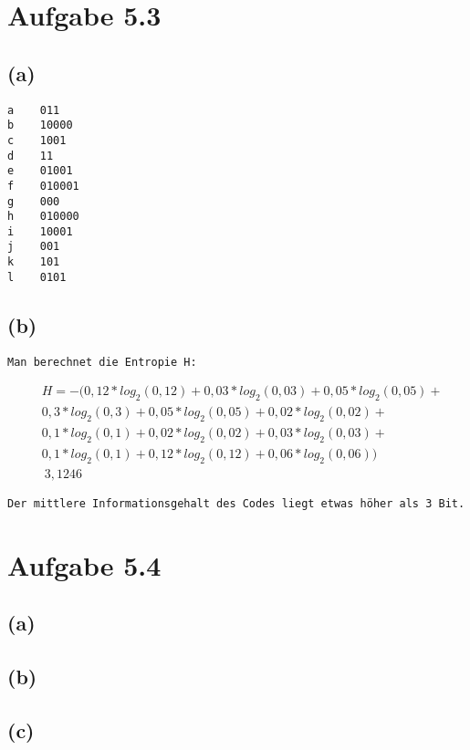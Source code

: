 \documentclass[12pt]{article}
\begin{document}
\section{Aufgabe 5.3}
\subsection{(a)}
\begin{verbatim}
a    011
b    10000
c    1001
d    11
e    01001
f    010001
g    000
h    010000
i    10001
j    001
k    101
l    0101
\end{verbatim}
\subsection{(b)}
\begin{verbatim}
Man berechnet die Entropie H:
\end{verbatim}
\begin{align}
&H = - (0,12*log_{2}(0,12) + 0,03*log_{2}(0,03) +  0,05*log_{2}(0,05) +\\
& 0,3*log_{2}(0,3) +  0,05*log_{2}(0,05) +  0,02*log_{2}(0,02) +\\
& 0,1*log_{2}(0,1) +  0,02*log_{2}(0,02) +  0,03*log_{2}(0,03) +\\
& 0,1*log_{2}(0,1) +  0,12*log_{2}(0,12) +  0,06*log_{2}(0,06))\\
&~3,1246
\end{align}
\begin{verbatim}
Der mittlere Informationsgehalt des Codes liegt etwas höher als 3 Bit.
\end{verbatim}

\section{Aufgabe 5.4}
\subsection{(a)}
\subsection{(b)}
\subsection{(c)}

\begin{align}
\end{align}
\end{document}
